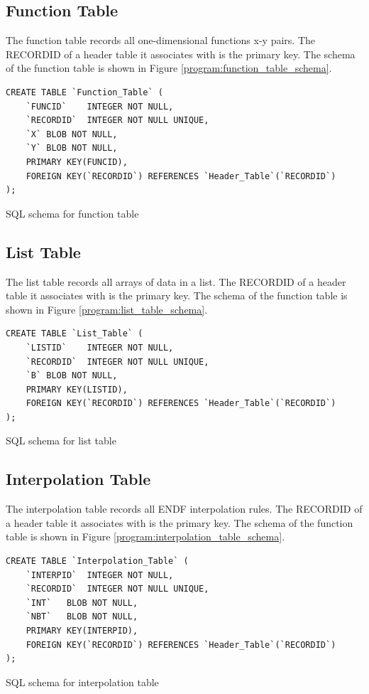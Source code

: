 \subsection{Function Table}
The function table records all one-dimensional functions x-y pairs. The RECORDID of a header table it associates with is the primary key. The schema of the function table is shown in Figure \ref{program:function_table_schema}.
\begin{program}[!htb]
\centering
\begin{verbatim} 
CREATE TABLE `Function_Table` (
	`FUNCID`	INTEGER NOT NULL,
	`RECORDID`	INTEGER NOT NULL UNIQUE,
	`X`	BLOB NOT NULL,
	`Y`	BLOB NOT NULL,
	PRIMARY KEY(FUNCID),
	FOREIGN KEY(`RECORDID`) REFERENCES `Header_Table`(`RECORDID`)
);
\end{verbatim}
\caption{ \label{program:function_table_schema}
SQL schema for function table}
\end{program}

\subsection{List Table}
The list table records all arrays of data in a list. The RECORDID of a header table it associates with is the primary key. The schema of the function table is shown in Figure \ref{program:list_table_schema}.
\begin{program}[!htb]
\centering
\begin{verbatim} 
CREATE TABLE `List_Table` (
	`LISTID`	INTEGER NOT NULL,
	`RECORDID`	INTEGER NOT NULL UNIQUE,
	`B`	BLOB NOT NULL,
	PRIMARY KEY(LISTID),
	FOREIGN KEY(`RECORDID`) REFERENCES `Header_Table`(`RECORDID`)
);
\end{verbatim}
\caption{ \label{program:list_table_schema}
SQL schema for list table}
\end{program}

\subsection{Interpolation Table}
The interpolation table records all ENDF interpolation rules. The RECORDID of a header table it associates with is the primary key. The schema of the function table is shown in Figure \ref{program:interpolation_table_schema}.
\begin{program}[!htb]
\centering
\begin{verbatim} 
CREATE TABLE `Interpolation_Table` (
	`INTERPID`	INTEGER NOT NULL,
	`RECORDID`	INTEGER NOT NULL UNIQUE,
	`INT`	BLOB NOT NULL,
	`NBT`	BLOB NOT NULL,
	PRIMARY KEY(INTERPID),
	FOREIGN KEY(`RECORDID`) REFERENCES `Header_Table`(`RECORDID`)
);
\end{verbatim}
\caption{ \label{program:interpolation_table_schema}
SQL schema for interpolation table}
\end{program}



